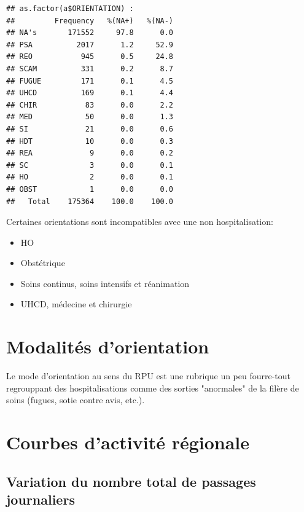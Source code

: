 \documentclass[12pt,english,french,twoside]{report}\usepackage[]{graphicx}\usepackage[]{color}
\makeatletter
\newenvironment{kframe}{%
 \def\at@end@of@kframe{}%
 \ifinner\ifhmode%
  \def\at@end@of@kframe{\end{minipage}}%
  \begin{minipage}{\columnwidth}%
 \fi\fi%
 \def\FrameCommand##1{\hskip\@totalleftmargin \hskip-\fboxsep
 \colorbox{shadecolor}{##1}\hskip-\fboxsep
     \hskip-\linewidth \hskip-\@totalleftmargin \hskip\columnwidth}%
 \MakeFramed {\advance\hsize-\width
   \@totalleftmargin\z@ \linewidth\hsize
   \@setminipage}}%
 {\par\unskip\endMakeFramed%
 \at@end@of@kframe}
\newenvironment{knitrout}{}{} %
\makeatother
\begin{document}
\begin{knitrout}
\begin{kframe}\begin{verbatim}
## as.factor(a$ORIENTATION) : 
##         Frequency   %(NA+)   %(NA-)
## NA's       171552     97.8      0.0
## PSA          2017      1.2     52.9
## REO           945      0.5     24.8
## SCAM          331      0.2      8.7
## FUGUE         171      0.1      4.5
## UHCD          169      0.1      4.4
## CHIR           83      0.0      2.2
## MED            50      0.0      1.3
## SI             21      0.0      0.6
## HDT            10      0.0      0.3
## REA             9      0.0      0.2
## SC              3      0.0      0.1
## HO              2      0.0      0.1
## OBST            1      0.0      0.0
##   Total    175364    100.0    100.0
\end{verbatim}
\end{kframe}
\end{knitrout}

Certaines orientations sont incompatibles avec une non hospitalisation:
\begin{itemize}
  \item HO
  \item Obstétrique
  \item Soins continus, soins intensifs et réanimation
  \item UHCD, médecine et chirurgie
  
\end{itemize}




\chapter{Modalités d'orientation}



Le mode d'orientation au sens du RPU est une rubrique un peu fourre-tout regrouppant des hospitalisations comme des sorties "anormales" de la filère de soins (fugues, sotie contre avis, etc.).


\chapter{Courbes d'activité régionale}


\section{Variation du nombre total de passages journaliers}
\end{document}
